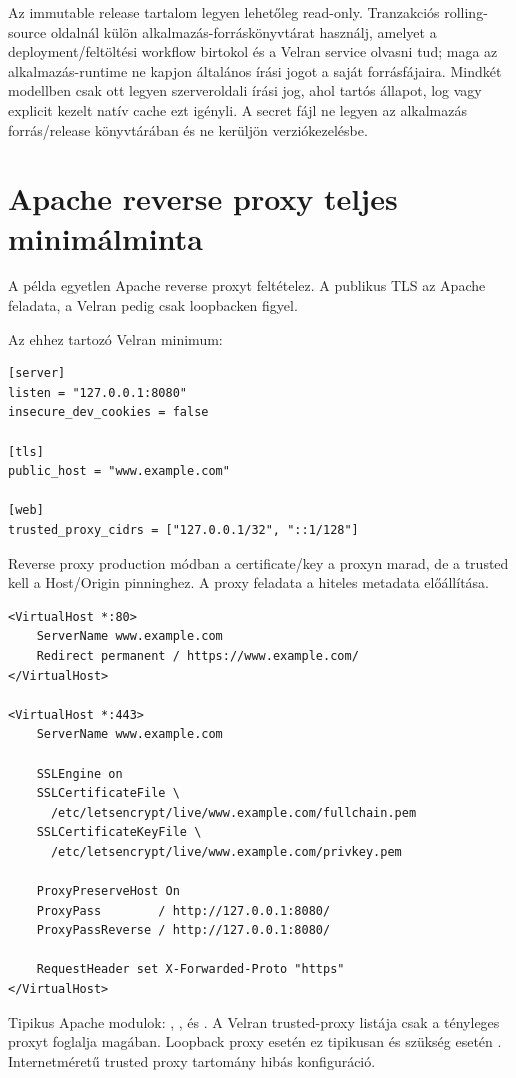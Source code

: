 Az immutable release tartalom legyen lehetőleg read-only. Tranzakciós rolling-source oldalnál külön alkalmazás-forráskönyvtárat használj, amelyet a deployment/feltöltési workflow birtokol és a Velran service olvasni tud; maga az alkalmazás-runtime ne kapjon általános írási jogot a saját forrásfájaira. Mindkét modellben csak ott legyen szerveroldali írási jog, ahol tartós állapot, log vagy explicit kezelt natív cache ezt igényli. A secret fájl ne legyen az alkalmazás forrás/release könyvtárában és ne kerüljön verziókezelésbe.

\section{Apache reverse proxy teljes minimálminta}

A példa egyetlen Apache reverse proxyt feltételez. A publikus TLS az Apache feladata, a Velran pedig csak loopbacken figyel.

Az ehhez tartozó Velran minimum:

\begin{lstlisting}
[server]
listen = "127.0.0.1:8080"
insecure_dev_cookies = false

[tls]
public_host = "www.example.com"

[web]
trusted_proxy_cidrs = ["127.0.0.1/32", "::1/128"]
\end{lstlisting}

Reverse proxy production módban a certificate/key a proxyn marad, de a trusted  kell a Host/Origin pinninghez. A proxy feladata a hiteles  metadata előállítása.

\begin{lstlisting}
<VirtualHost *:80>
    ServerName www.example.com
    Redirect permanent / https://www.example.com/
</VirtualHost>

<VirtualHost *:443>
    ServerName www.example.com

    SSLEngine on
    SSLCertificateFile \
      /etc/letsencrypt/live/www.example.com/fullchain.pem
    SSLCertificateKeyFile \
      /etc/letsencrypt/live/www.example.com/privkey.pem

    ProxyPreserveHost On
    ProxyPass        / http://127.0.0.1:8080/
    ProxyPassReverse / http://127.0.0.1:8080/

    RequestHeader set X-Forwarded-Proto "https"
</VirtualHost>
\end{lstlisting}

Tipikus Apache modulok: , ,  és . A Velran trusted-proxy listája csak a tényleges proxyt foglalja magában. Loopback proxy esetén ez tipikusan  és szükség esetén . Internetméretű trusted proxy tartomány hibás konfiguráció.

